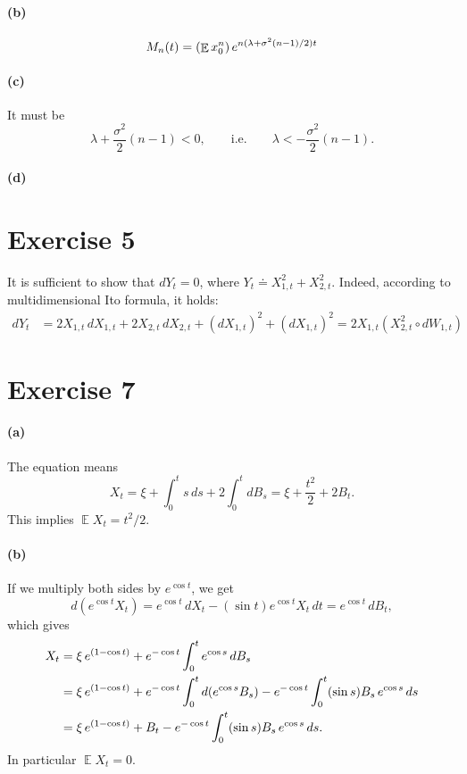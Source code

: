 \documentclass[a4paper,11pt]{article}
\theoremstyle{definition}
\theoremstyle{plain}
\theoremstyle{remark}
\DeclarePairedDelimiter{\parr}{(}{)}
\DeclareMathOperator*{\expval}{\mathbb{E}}
\begin{document}
\paragraph*{(b)}

$$
M_n(t) = \parr*{\expval x_0^n}\,e^{n(\lambda + \sigma^2(n-1)/2)t}
$$

\paragraph*{(c)}

It must be 
$$
\lambda + \frac{\sigma^2}{2}(n-1) < 0, \qquad \text{i.e.} \qquad \lambda < - \frac{\sigma^2}{2}(n-1).
$$

\paragraph*{(d)}

\section*{Exercise 5}

It is sufficient to show that $dY_t = 0$, where $Y_t \doteq X_{1,t}^2+X_{2,t}^2$. Indeed, according to multidimensional Ito formula, it holds:
\begin{align*}
dY_t & = 2X_{1,t}\,dX_{1,t} + 2X_{2,t}\,dX_{2,t} + (dX_{1,t})^2 + (dX_{1,t})^2 = 2X_{1,t}(X_{2,t}^2\circ dW_{1,t}) 
\end{align*}

\section*{Exercise 7}

\paragraph*{(a)}

The equation means
$$
X_t = \xi + \int_0^ts\,ds + 2\int_0^tdB_s = \xi + \frac{t^2}{2} + 2B_t.
$$
This implies $\expval X_t = t^2/2$.

\paragraph*{(b)}

If we multiply both sides by $e^{\cos t}$, we get
$$
d(e^{\cos t}X_t) = e^{\cos t}\,dX_t - (\sin t)e^{\cos t}X_t\,dt = e^{\cos t}\,dB_t,
$$
which gives
\begin{align*}
X_t & = \xi\,e^{(1-\cos t)} + e^{-\cos t}\int_0^te^{\cos s}\,dB_s  \\ & = \xi\,e^{(1-\cos t)} + e^{-\cos t}\int_0^td\parr*{e^{\cos s}B_s} -e^{-\cos t}\int_0^t(\sin s)B_s\,e^{\cos s}\,ds \\ & = \xi\,e^{(1-\cos t)} + B_t -e^{-\cos t}\int_0^t(\sin s)B_s\,e^{\cos s}\,ds.
\end{align*}
In particular $\expval X_t = 0$.
\end{document}
